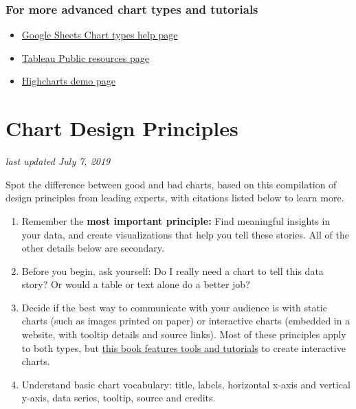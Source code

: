 \documentclass[
  english,
]{book}
\providecommand{\tightlist}{%
  \setlength{\itemsep}{0pt}\setlength{\parskip}{0pt}}
\begin{document}
\hypertarget{for-more-advanced-chart-types-and-tutorials}{%
\subsubsection*{For more advanced chart types and tutorials}\label{for-more-advanced-chart-types-and-tutorials}}

\begin{itemize}
\tightlist
\item
  \href{https://support.google.com/docs/answer/190718}{Google Sheets Chart types help page}
\item
  \href{https://public.tableau.com/en-us/s/resources}{Tableau Public resources page}
\item
  \href{http://www.highcharts.com/demo}{Highcharts demo page}
\end{itemize}

\hypertarget{chart-design}{%
\section{Chart Design Principles}\label{chart-design}}

\emph{last updated July 7, 2019}

Spot the difference between good and bad charts, based on this compilation of design principles from leading experts, with citations listed below to learn more.

\begin{enumerate}
\def\labelenumi{\arabic{enumi})}
\item
  Remember the \textbf{most important principle:} Find meaningful insights in your data, and create visualizations that help you tell these stories. All of the other details below are secondary.
\item
  Before you begin, ask yourself: Do I really need a chart to tell this data story? Or would a table or text alone do a better job?
\item
  Decide if the best way to communicate with your audience is with static charts (such as images printed on paper) or interactive charts (embedded in a website, with tooltip details and source links). Most of these principles apply to both types, but \href{chart}{this book features tools and tutorials} to create interactive charts.
\item
  Understand basic chart vocabulary: title, labels, horizontal x-axis and vertical y-axis, data series, tooltip, source and credits.
\end{enumerate}
\end{document}
